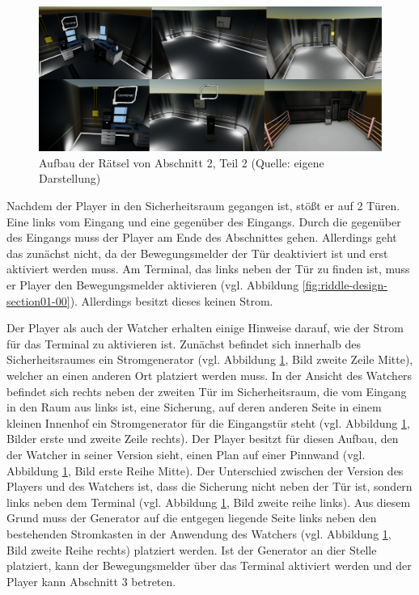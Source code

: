 \begin{figure}[ht]
\centering
\includegraphics[width=1\linewidth]{content/pictures/Rätseldesign - Abschnitt01 - Rätsel01.png}
\caption{Aufbau der Rätsel von Abschnitt 2, Teil 2 (Quelle: eigene Darstellung)}
\label{fig:riddle-design-section01-01}
\end{figure}

Nachdem der Player in den Sicherheitsraum gegangen ist, stößt er auf 2 Türen. Eine links vom Eingang und eine gegenüber des Eingangs. Durch die gegenüber des Eingangs muss der Player am Ende des Abschnittes gehen. Allerdings geht das zunächst nicht, da der Bewegungsmelder der Tür deaktiviert ist und erst aktiviert werden muss. Am Terminal, das links neben der Tür zu finden ist, muss er Player den Bewegungsmelder aktivieren (vgl. Abbildung \ref{fig:riddle-design-section01-00}). Allerdings besitzt dieses keinen Strom. 

Der Player als auch der Watcher erhalten einige Hinweise darauf, wie der Strom für das Terminal zu aktivieren ist. Zunächst befindet sich innerhalb des Sicherheitsraumes ein Stromgenerator (vgl. Abbildung \ref{fig:riddle-design-section01-01}, Bild zweite Zeile Mitte), welcher an einen anderen Ort platziert werden muss. In der Ansicht des Watchers befindet sich rechts neben der zweiten Tür im Sicherheitsraum, die vom Eingang in den Raum aus links ist, eine Sicherung, auf deren anderen Seite in einem kleinen Innenhof ein Stromgenerator für die Eingangstür steht (vgl. Abbildung \ref{fig:riddle-design-section01-01}, Bilder erste und zweite Zeile rechts). Der Player besitzt für diesen Aufbau, den der Watcher in seiner Version sieht, einen Plan auf einer Pinnwand (vgl. Abbildung \ref{fig:riddle-design-section01-01}, Bild erste Reihe Mitte). Der Unterschied zwischen der Version des Players und des Watchers ist, dass die Sicherung nicht neben der Tür ist, sondern links neben dem Terminal (vgl. Abbildung \ref{fig:riddle-design-section01-01}, Bild zweite reihe links). Aus diesem Grund muss der Generator auf die entgegen liegende Seite links neben den bestehenden Stromkasten in der Anwendung des Watchers (vgl. Abbildung \ref{fig:riddle-design-section01-01}, Bild zweite Reihe rechts) platziert werden. Ist der Generator an dier Stelle platziert, kann der Bewegungsmelder über das Terminal aktiviert werden und der Player kann Abschnitt 3 betreten.

